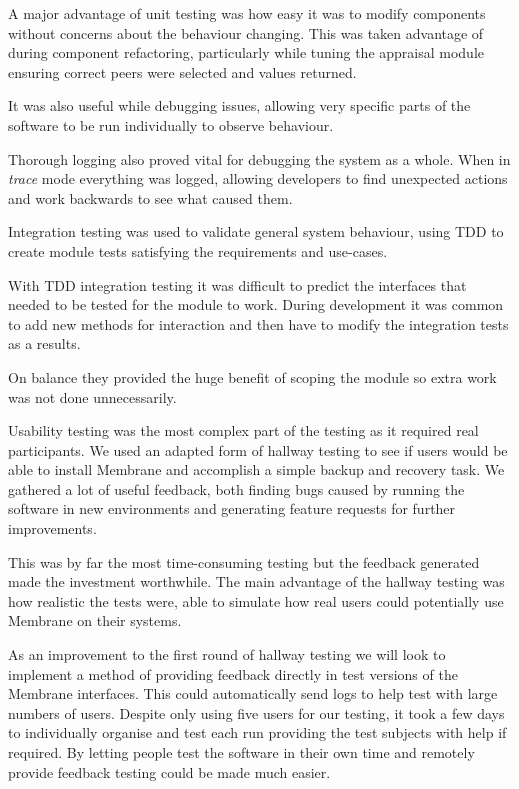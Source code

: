 \documentclass[11pt, a4paper, twoside]{report}
\begin{document}
A major advantage of unit testing was how easy it was to modify components without concerns about the behaviour changing. This was taken advantage of during component refactoring, particularly while tuning the appraisal module ensuring correct peers were selected and values returned.

It was also useful while debugging issues, allowing very specific parts of the software to be run individually to observe behaviour.

Thorough logging also proved vital for debugging the system as a whole. When in \emph{trace} mode everything was logged, allowing developers to find unexpected actions and work backwards to see what caused them.

Integration testing was used to validate general system behaviour, using TDD to create module tests satisfying the requirements and use-cases.

With TDD integration testing it was difficult to predict the interfaces that needed to be tested for the module to work. During development it was common to add new methods for interaction and then have to modify the integration tests as a results.

On balance they provided the huge benefit of scoping the module so extra work was not done unnecessarily.

Usability testing was the most complex part of the testing as it required real participants. We used an adapted form of hallway testing to see if users would be able to install Membrane and accomplish a simple backup and recovery task. We gathered a lot of useful feedback, both finding bugs caused by running the software in new environments and generating feature requests for further improvements.

This was by far the most time-consuming testing but the feedback generated made the investment worthwhile. The main advantage of the hallway testing was how realistic the tests were, able to simulate how real users could potentially use Membrane on their systems.

As an improvement to the first round of hallway testing we will look to implement a method of providing feedback directly in test versions of the Membrane interfaces. This could automatically send logs to help test with large numbers of users. Despite only using five users for our testing, it took a few days to individually organise and test each run providing the test subjects with help if required. By letting people test the software in their own time and remotely provide feedback testing could be made much easier.
\end{document}
